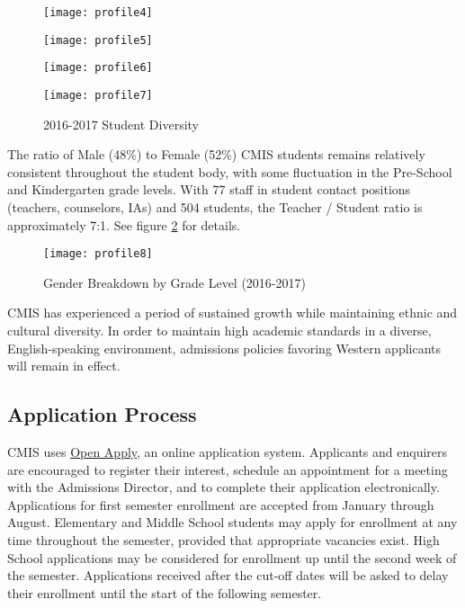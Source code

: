 \begin{figure}[H]
\centering
\caption{2016-2017 Student Diversity}
\label{figure:studentdiversity}
\begin{minipage}{0.5\textwidth}
\texttt{[image: profile4]}
\end{minipage}%
\begin{minipage}{0.5\textwidth}
\texttt{[image: profile5]}
\end{minipage}

\begin{minipage}{0.5\textwidth}
\texttt{[image: profile6]}
\end{minipage}%
\begin{minipage}{0.5\textwidth}
\texttt{[image: profile7]}
\end{minipage}
\end{figure}


The ratio of Male (48\%) to Female (52\%) CMIS students remains relatively consistent throughout the student body, with some fluctuation in the Pre-School and Kindergarten grade levels.   With 77 staff in student contact positions (teachers, counselors, IAs) and 504 students, the Teacher / Student ratio is approximately 7:1. See figure \ref{figure:GenderBreakdown} for details.

\begin{figure}[H]
\centering
\texttt{[image: profile8]}
\caption{Gender Breakdown by Grade Level (2016-2017)}
\label{figure:GenderBreakdown}
\end{figure}


CMIS has experienced a period of sustained growth while maintaining ethnic and cultural diversity.  In order to maintain high academic standards in a diverse, English-speaking environment, admissions policies favoring Western applicants will remain in effect.  


\subsection{Application Process}

CMIS uses \href{https://cmis.openapply.com/}{Open Apply}, an online application system.  Applicants and enquirers are encouraged to register their interest, schedule an appointment for a meeting with the Admissions Director, and to complete their application electronically.  Applications for first semester enrollment are accepted from January through August.  Elementary and Middle School students may apply for enrollment at any time throughout the semester, provided that appropriate vacancies exist.  High School applications may be considered for enrollment up until the second week of the semester.  Applications received after the cut-off dates will be asked to delay their enrollment until the start of the following semester.  


